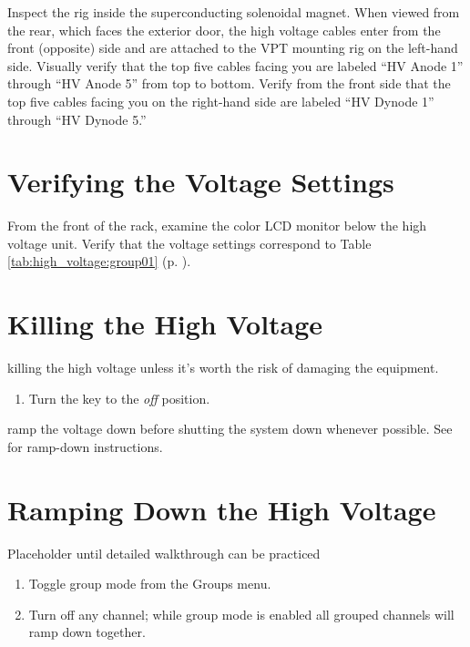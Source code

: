 Inspect the rig inside the superconducting solenoidal magnet.  When viewed from the rear, which faces the exterior door, the high voltage cables enter from the front (opposite) side and are attached to the VPT mounting rig on the left-hand side.  Visually verify that the top five cables facing you are labeled ``HV Anode 1'' through ``HV Anode 5'' from top to bottom.  Verify from the front side that the top five cables facing you on the right-hand side are labeled ``HV Dynode 1'' through ``HV Dynode 5.''

\section{Verifying the Voltage Settings}
\label{sec:op_high_voltage:verify_voltage}

From the front of the rack, examine the color LCD monitor below the high voltage unit.  Verify that the voltage settings correspond to Table \ref{tab:high_voltage:group01} (p. \pageref{tab:high_voltage:group01}).

\section{Killing the High Voltage}
\label{sec:op_high_voltage:kill}

\begin{avoid} killing the high voltage unless it's worth the risk of damaging the equipment.\end{avoid}

\begin{enumerate}
\item Turn the key to the \textit{off} position.
\end{enumerate}

\begin{pleasedo} ramp the voltage down before shutting the system down whenever possible.  See  for ramp-down instructions.\end{pleasedo}

\section{Ramping Down the High Voltage}
\label{sec:op_high_voltage:rampdown}

\FIXME{} Placeholder until detailed walkthrough can be practiced

\begin{enumerate}
\item Toggle group mode from the Groups menu.
\item Turn off any channel; while group mode is enabled all grouped channels will ramp down together.
\end{enumerate}

